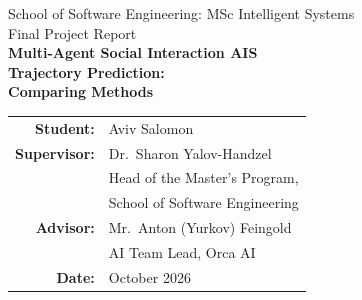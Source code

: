 \documentclass[12pt, a4paper]{article}
\begin{document}
  \begin{titlepage}
      \centering
      \vspace*{1cm}

      {\large School of Software Engineering: MSc Intelligent Systems}\\[0.5cm]
      {\large Final Project Report}\\[1.5cm]

      {\Huge\bfseries Multi-Agent Social Interaction AIS\\[0.3cm]
      Trajectory Prediction:\\[0.3cm]
      Comparing Methods}\\[2cm]

      \begin{tabular}{rl}
          \textbf{Student:}    & Aviv Salomon \\[0.3cm]
          \textbf{Supervisor:} & Dr.\ Sharon Yalov-Handzel \\
                               & Head of the Master's Program, \\
                               & School of Software Engineering \\[0.3cm]
          \textbf{Advisor:}    & Mr.\ Anton (Yurkov) Feingold \\
                               & AI Team Lead, Orca AI \\[0.3cm]
          \textbf{Date:}       & October 2026 \\
      \end{tabular}

      \vfill
  \end{titlepage}
\end{document}
